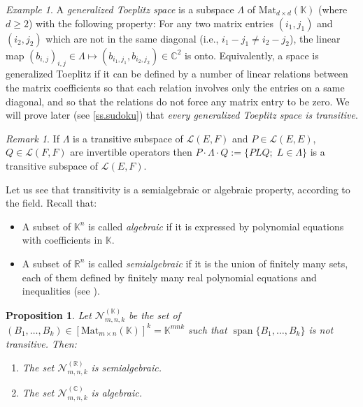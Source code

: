 \documentclass[10pt, a4paper]{amsart}
\theoremstyle{plain}
\newtheorem{prop}[lemma]{Proposition}
\theoremstyle{definition}
\theoremstyle{remark}
\theoremstyle{note}
\newtheorem{rem}[lemma]{Remark}
\newtheorem{example}[lemma]{Example}
\numberwithin{equation}{section}
\begin{document}
\begin{example}\label{ex.gen Toeplitz}
A \emph{generalized Toeplitz space} is a subspace $\Lambda$ of ${\mathrm{Mat}}_{d\times d}({\mathbb{K}})$ 
(where $d \ge 2$)
with the following property:
For any two matrix entries $(i_1,j_1)$ and $(i_2,j_2)$ which are not in the same diagonal
(i.e., $i_1-j_1 \neq i_2-j_2$), 
the linear map $(b_{i,j})_{i,j} \in \Lambda \mapsto (b_{i_1,j_1},b_{i_2,j_2}) \in {\mathbb{C}}^2$ is onto.
Equivalently, a space is generalized Toeplitz if 
it can be defined by a number of linear relations between the matrix coefficients
so that each relation involves only the entries on a same diagonal,
and so that the relations do not force any matrix entry to be zero.
We will prove later (see \cref{ss.sudoku})
that \emph{every generalized Toeplitz space is transitive}.
\end{example}

\begin{rem}\label{r.transitivity trick}
If $\Lambda$ is a transitive subspace of $\mathcal{L}(E,F)$
and $P \in \mathcal{L}(E,E)$, $Q \in \mathcal{L}(F,F)$ are invertible operators then
$P \cdot \Lambda \cdot Q := \{PLQ ; \;  L \in \Lambda\}$ 
is a transitive subspace of $\mathcal{L}(E,F)$.
\end{rem}

\medskip

Let us see that transitivity is a semialgebraic or algebraic property, according to the field.
Recall that:
\begin{itemize}
\item A subset of ${\mathbb{K}}^n$ is called \emph{algebraic} if it is expressed by 
polynomial equations with coefficients in ${\mathbb{K}}$.
\item A subset of ${\mathbb{R}}^n$ is called \emph{semialgebraic} if it is 
the union of finitely many sets, each of them defined by finitely many  real polynomial equations
and inequalities (see \cite{BR,BCR}).
\end{itemize}

\begin{prop}\label{p.NT algebraicity}
Let ${\mathcal{N}}_{m,n,k}^{({\mathbb{K}})}$ be the set of $(B_1, \dots, B_k) \in [{\mathrm{Mat}}_{m \times n}({\mathbb{K}})]^k={\mathbb{K}}^{mnk}$ such that
$\operatorname*{span}\{B_1, \dots, B_k\}$ is not transitive.
Then:
\begin{enumerate}
\item\label{i.semialgebraic}
The set ${\mathcal{N}}_{m,n,k}^{({\mathbb{R}})}$ is semialgebraic.
\item\label{i.algebraic} 
The set ${\mathcal{N}}_{m,n,k}^{({\mathbb{C}})}$ is algebraic.
\end{enumerate}
\end{prop}
\end{document}
